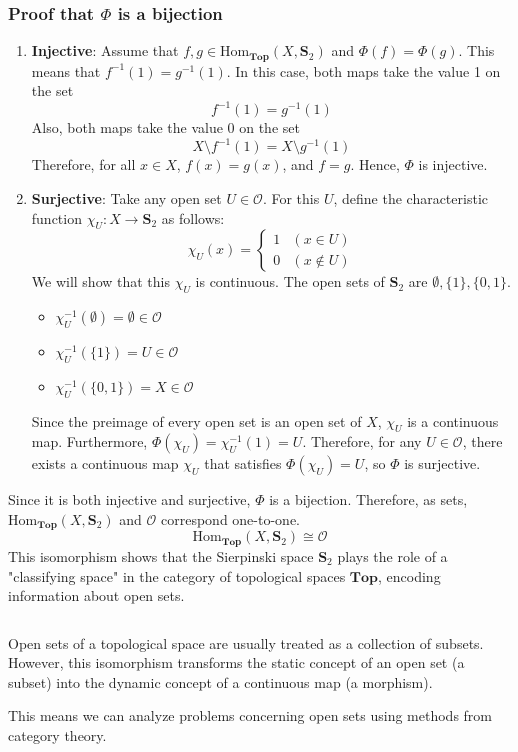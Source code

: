 \documentclass{article}
\begin{document}
\subsubsection*{Proof that $\Phi$ is a bijection}

\begin{enumerate}
	\item \textbf{Injective}:
	      Assume that $f, g \in \mathrm{Hom}_{\mathbf{Top}}(X, \mathbf{S}_ {2})$ and $\Phi(f) = \Phi(g)$.
	      This means that $f^{-1}(1) = g^{-1}(1)$.
	      In this case, both maps take the value 1 on the set
	      $$ f^{-1}(1) = g^{-1}(1) $$
	      Also, both maps take the value 0 on the set
	      $$ X \setminus f^{-1}(1) = X \setminus g^{-1}(1) $$
	      Therefore, for all $x \in X$, $f(x) = g(x)$, and $f = g$.
	      Hence, $\Phi$ is injective.

	\item \textbf{Surjective}:
	      Take any open set $U \in \mathcal{O}$.
	      For this $U$, define the characteristic function $\chi_U: X \to \mathbf{S}_ {2}$ as follows:
	      $$ \chi_U(x) =
		      \begin{cases}
			      1 & (x \in U)    \\
			      0 & (x \notin U)
		      \end{cases}
	      $$
	      We will show that this $\chi_U$ is continuous.
	      The open sets of $\mathbf{S}_ {2}$ are $\emptyset, \{1\}, \{0, 1\}$.
	      \begin{itemize}
		      \item $\chi_U^{-1}(\emptyset) = \emptyset \in \mathcal{O}$
		      \item $\chi_U^{-1}(\{1\}) = U \in \mathcal{O}$
		      \item $\chi_U^{-1}(\{0, 1\}) = X \in \mathcal{O}$
	      \end{itemize}
	      Since the preimage of every open set is an open set of $X$, $\chi_U$ is a continuous map.
	      Furthermore, $\Phi(\chi_U) = \chi_U^{-1}(1) = U$.
	      Therefore, for any $U \in \mathcal{O}$, there exists a continuous map $\chi_U$ that satisfies $\Phi(\chi_U) = U$, so $\Phi$ is surjective.
\end{enumerate}

Since it is both injective and surjective, $\Phi$ is a bijection.
Therefore, as sets, $\mathrm{Hom}_{\mathbf{Top}}(X, \mathbf{S}_ {2})$ and $\mathcal{O}$ correspond one-to-one.
$$
	\mathrm{Hom}_{\mathbf{Top}}(X, \mathbf{S}_ {2}) \cong \mathcal{O}
$$
This isomorphism shows that the Sierpinski space $\mathbf{S}_ {2}$ plays the role of a "classifying space" in the category of topological spaces $\mathbf{Top}$, encoding information about open sets.

${}$

Open sets of a topological space are usually treated as a collection of subsets.
However, this isomorphism transforms the static concept of an open set (a subset) into the dynamic concept of a continuous map (a morphism).

This means we can analyze problems concerning open sets using methods from category theory.
\end{document}
